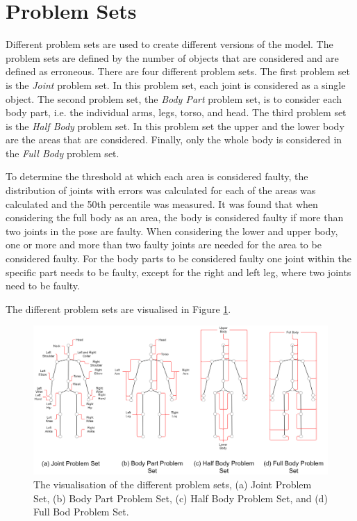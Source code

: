 \section{Problem Sets}
\label{sec:problem_set}

Different problem sets are used to create different versions of the model. The problem sets are defined by the number of objects that are considered and are defined as erroneous. There are four different problem sets. The first problem set is the \textit{Joint} problem set. In this problem set, each joint is considered as a single object. The second problem set,  the \textit{Body Part} problem set, is to consider each body part, i.e. the individual arms, legs, torso, and head. The third problem set is the \textit{Half Body} problem set. In this problem set the upper and the lower body are the areas that are considered. Finally, only the whole body is considered in the \textit{Full Body} problem set.

To determine the threshold at which each area is considered faulty, the distribution of joints with errors was calculated for each of the areas was calculated and the 50th percentile was measured. It was found that when considering the full body as an area, the body is considered faulty if more than two joints in the pose are faulty. When considering the lower and upper body, one or more and more than two faulty joints are needed for the area to be considered faulty. For the body parts to be considered faulty one joint within the specific part needs to be faulty, except for the right and left leg, where two joints need to be faulty.

The different problem sets are visualised in Figure \ref{fig:ps}.

\begin{figure}[ht]
  \centering
  \includegraphics[width=\textwidth]{figures/HPE/problem_sets.png}
  \caption[Visualisation of the Problemsets]{The visualisation of the different problem sets, (a) Joint Problem Set, (b) Body Part Problem Set, (c) Half Body Problem Set, and (d) Full Bod Problem Set.}
  \label{fig:ps}
\end{figure}
